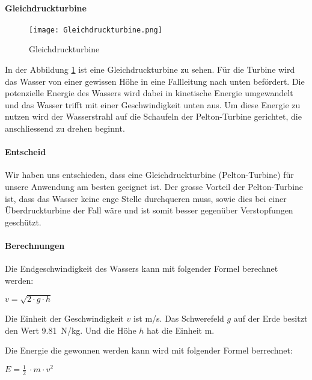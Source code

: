 \paragraph{Gleichdruckturbine}

\begin{figure} [H]
	\centering
	\texttt{[image: Gleichdruckturbine.png]}
	\caption{Gleichdruckturbine}
	\label{fig:Gleichdruckturbine}
\end{figure}

In der Abbildung \ref{fig:Gleichdruckturbine}  ist eine Gleichdruckturbine zu sehen. Für die Turbine wird das Wasser von einer gewissen Höhe in eine Fallleitung nach unten befördert. Die potenzielle Energie des Wassers wird dabei in kinetische Energie umgewandelt und das Wasser trifft mit einer Geschwindigkeit unten aus. Um diese Energie zu nutzen wird der Wasserstrahl auf die Schaufeln der Pelton-Turbine gerichtet, die anschliessend zu drehen beginnt. 

\paragraph{Entscheid}

Wir haben uns entschieden, dass eine Gleichdruckturbine (Pelton-Turbine) für unsere Anwendung am besten geeignet ist. Der grosse Vorteil der Pelton-Turbine ist, dass das Wasser keine enge Stelle durchqueren muss, sowie dies bei einer Überdruckturbine der Fall wäre und ist somit besser gegenüber Verstopfungen geschützt.

\newpage

\paragraph{Berechnungen}

Die Endgeschwindigkeit des Wassers kann mit folgender Formel berechnet werden:
\begin{center}
\(v = \sqrt{2 \cdot g \cdot h} \)
\end{center}

Die Einheit der Geschwindigkeit \(v\) ist \si{m/s}. Das Schwerefeld \(g\) auf der Erde besitzt den Wert 9.81~\si{N/kg}. Und die Höhe \(h\) hat die Einheit \si{m}.

\bigskip

Die Energie die gewonnen werden kann wird mit folgender Formel berrechnet:

\begin{center}
\(E =\frac 12\ \cdot m \cdot v^2\)
\end{center}

